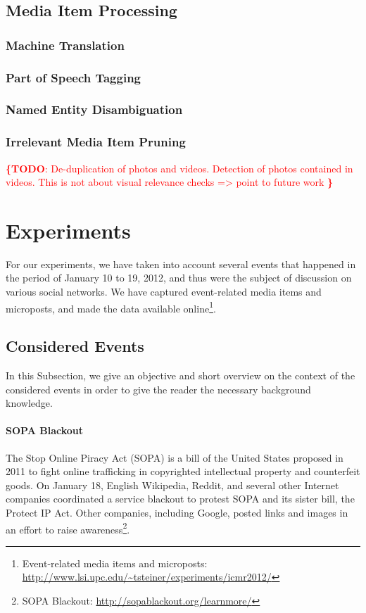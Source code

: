 \documentclass{acm_proc_article-sp}
\newcommand{\todo}[1]{\noindent\textcolor{red}{{\bf \{TODO}: #1{\bf \}}}}
\newcommand{\inlinelistingsize}{\fontsize{8pt}{11pt}}
\let\oldurl\url
\renewcommand{\url}[1]{\inlinelistingsize\oldurl{#1}}
\begin{document}
\subsection{Media Item Processing}

\subsubsection{Machine Translation}

\subsubsection{Part of Speech Tagging}

\subsubsection{Named Entity Disambiguation}

\subsubsection{Irrelevant Media Item Pruning}
\todo{
De-duplication of photos and videos.
Detection of photos contained in videos.
This is not about visual relevance checks => point to future work
}

\section{Experiments}
For our experiments, we have taken into account several events that happened in the period of January 10 to 19, 2012, and thus were the subject of discussion on various social networks.
We have captured event-related media items and microposts, and made the data available online\footnote{Event-related media items and microposts: \url{http://www.lsi.upc.edu/~tsteiner/experiments/icmr2012/}}. 

\subsection{Considered Events}
In this Subsection, we give an objective and short overview on the context of the considered events in order to give the reader the necessary background knowledge.

\paragraph{SOPA Blackout}
The Stop Online Piracy Act (SOPA) is a bill of the United States proposed in 2011 to fight online trafficking in copyrighted intellectual property and counterfeit goods.
On January 18, English Wikipedia, Reddit, and several other Internet companies coordinated a service blackout to protest SOPA and its sister bill, the Protect IP Act.
Other companies, including Google, posted links and images in an effort to raise awareness\footnote{SOPA Blackout: \url{http://sopablackout.org/learnmore/}}.
\end{document}
